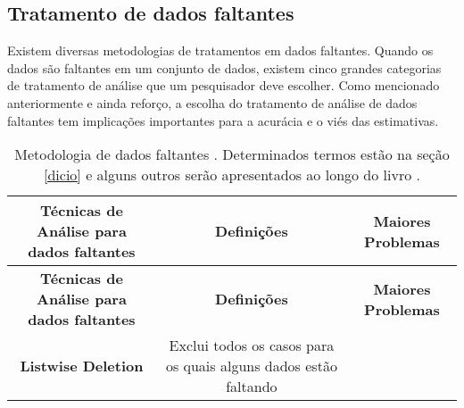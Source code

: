 \documentclass[
  openany]{book}
\begin{document}
\hypertarget{tratamento-de-dados-faltantes}{%
\subsection{Tratamento de dados faltantes}\label{tratamento-de-dados-faltantes}}

Existem diversas metodologias de tratamentos em dados faltantes. Quando os dados são faltantes em um conjunto de dados, existem cinco grandes categorias de tratamento de análise que um pesquisador deve escolher. Como mencionado anteriormente e ainda reforço, a escolha do tratamento de análise de dados faltantes tem implicações importantes para a acurácia e o viés das estimativas.

\begin{longtable}[]{@{}ccc@{}}
\caption{\label{tab:preprocess} Metodologia de dados faltantes \citep{tecnicasinput}. Determinados termos estão na seção \ref{dicio} e alguns outros serão apresentados ao longo do livro .}\tabularnewline
\toprule
\begin{minipage}[b]{0.30\columnwidth}\centering
\textbf{Técnicas de Análise para dados faltantes}\strut
\end{minipage} & \begin{minipage}[b]{0.30\columnwidth}\centering
\textbf{Definições}\strut
\end{minipage} & \begin{minipage}[b]{0.30\columnwidth}\centering
\textbf{Maiores Problemas}\strut
\end{minipage}\tabularnewline
\midrule
\endfirsthead
\toprule
\begin{minipage}[b]{0.30\columnwidth}\centering
\textbf{Técnicas de Análise para dados faltantes}\strut
\end{minipage} & \begin{minipage}[b]{0.30\columnwidth}\centering
\textbf{Definições}\strut
\end{minipage} & \begin{minipage}[b]{0.30\columnwidth}\centering
\textbf{Maiores Problemas}\strut
\end{minipage}\tabularnewline
\midrule
\endhead
\begin{minipage}[t]{0.30\columnwidth}\centering
\textbf{Listwise Deletion}\strut
\end{minipage} & \begin{minipage}[t]{0.30\columnwidth}\centering
Exclui todos os casos para os quais alguns dados estão faltando\strut
\end{minipage} & \begin{minipage}[t]{0.30\columnwidth}\centering

\end{minipage}
\end{longtable}
\end{document}
